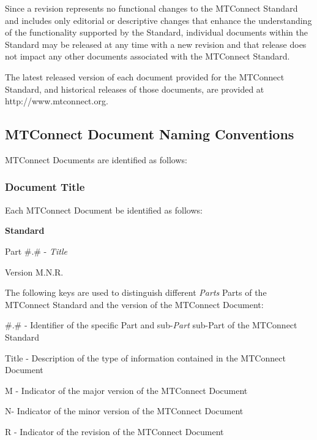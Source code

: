 \documentclass{mtconnect}	%
\providecommand{\DIFadd}[1]{{\hspace{0pt}\protect\color{blue}#1}} %
\providecommand{\DIFdel}[1]{{\hspace{0pt}\protect\color{red}#1}}                      %
\providecommand{\DIFaddbegin}{} %
\providecommand{\DIFaddend}{} %
\providecommand{\DIFdelbegin}{} %
\providecommand{\DIFdelend}{} %
\begin{document}
Since a \gls{revision} represents no functional changes to the MTConnect Standard and includes only editorial or descriptive changes that enhance the understanding of the functionality supported by the Standard, individual documents within the Standard may be released at any time with a new \gls{revision} and that release does not impact any other documents associated with the MTConnect Standard.

The latest released version of each document provided for the MTConnect Standard, and historical releases of those documents, are provided at http://www.mtconnect.org.

\newpage

\subsection{MTConnect Document Naming Conventions}

MTConnect Documents are identified as follows:

\subsubsection{Document Title}

Each MTConnect Document \MUST be identified as follows:

\newline \centerline{\large{\textbf{\mtconnectregistered Standard}}}
\newline \centerline{Part \#.\# - \textit{Title}}
\newline \centerline{Version M.N.R.}

The following keys are used to distinguish different \DIFdelbegin \DIFdel{\textit{Parts} }\DIFdelend \DIFaddbegin \DIFadd{Parts }\DIFaddend of the MTConnect Standard and the version of the MTConnect Document:

\tab	\#.\# - Identifier of the specific Part and \DIFdelbegin \DIFdel{sub-\textit{Part} }\DIFdelend \DIFaddbegin \DIFadd{sub-Part }\DIFaddend of the MTConnect Standard 

\tab	Title - Description of the type of information contained in the MTConnect Document

\tab	M - Indicator of the \gls{major} version of the MTConnect Document

\tab	N- Indicator of the \gls{minor} version of the MTConnect Document

\tab	R - Indicator of the revision of the MTConnect Document
\end{document}
